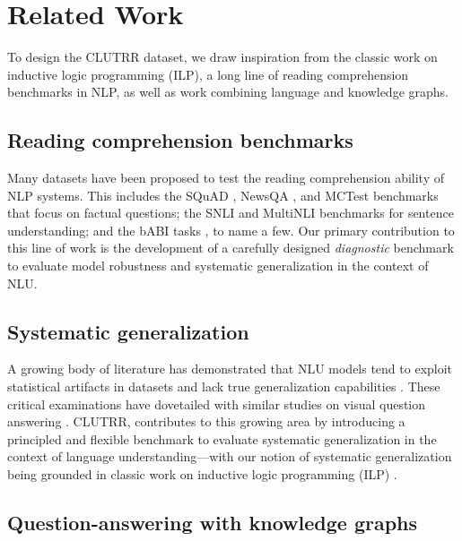 \documentclass[letterpaper, 12pt]{report}
\begin{document}
\section{Related Work}
\label{sec:clutrr_related_work}

To design the CLUTRR dataset, we draw inspiration from the classic work on inductive logic programming (ILP), a long line of reading comprehension benchmarks in NLP, as well as work combining language and knowledge graphs.

\subsection{Reading comprehension benchmarks}

Many datasets have been proposed to test the reading comprehension ability of NLP systems. This includes the SQuAD \cite{Rajpurkar2016-yc}, NewsQA \cite{Trischler2016-fc}, and MCTest \cite{richardson2013mctest} benchmarks that focus on factual questions; the SNLI \cite{bowman2015large} and MultiNLI \cite{williams2018broad} benchmarks for sentence understanding; and the bABI tasks \cite{Weston2015-is}, to name a few.
Our primary contribution to this line of work is the development of a carefully designed {\em diagnostic} benchmark to evaluate model robustness and systematic generalization in the context of NLU.

\subsection{Systematic generalization}

A growing body of literature has demonstrated that NLU models tend to exploit statistical artifacts in datasets and lack true generalization capabilities \cite{jia2017adversarial,gururangan2018annotation, kaushik2018much, lake2017generalization}.
These critical examinations have dovetailed with similar studies on visual question answering \citep{agrawal2016analyzing,bahdanau2018systematic,Johnson2016-mw}.
CLUTRR, contributes to this growing area by introducing a principled and flexible benchmark to evaluate systematic generalization in the context of language understanding---with our notion of systematic generalization being grounded in classic work on inductive logic programming (ILP) \cite{Quinlan1990-iv}.


\subsection{Question-answering with knowledge graphs}
\end{document}
